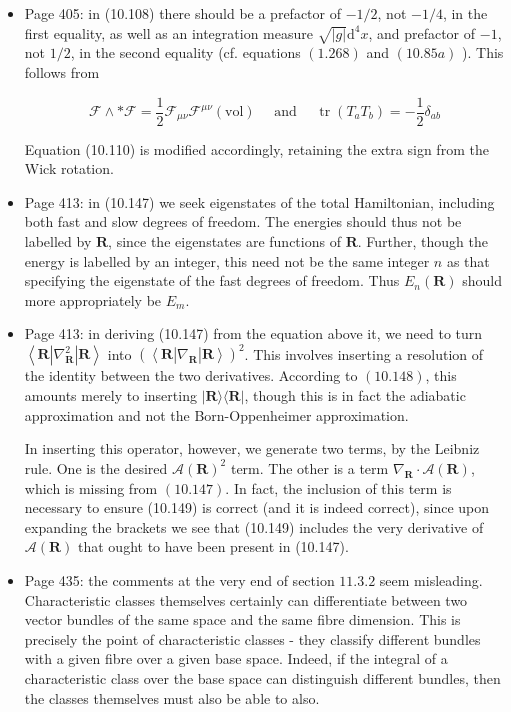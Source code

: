 \documentclass{article}
\begin{document}
\begin{itemize}
\item Page 405: in (10.108) there should be a prefactor of $-1 / 2$, not $-1 / 4$, in the first equality, as well as an integration measure $\sqrt{|g|} \mathrm{d}^{4} x$, and prefactor of $-1$, not $1 / 2$, in the second equality (cf. equations $(1.268)$ and $(10.85 a)$ ). This follows from

$$
\mathcal{F} \wedge * \mathcal{F}=\frac{1}{2} \mathcal{F}_{\mu \nu} \mathcal{F}^{\mu \nu}(\mathrm{vol}) \quad \text { and } \quad \operatorname{tr}\left(T_{a} T_{b}\right)=-\frac{1}{2} \delta_{a b}
$$

Equation (10.110) is modified accordingly, retaining the extra sign from the Wick rotation.

\item Page 413: in (10.147) we seek eigenstates of the total Hamiltonian, including both fast and slow degrees of freedom. The energies should thus not be labelled by $\mathbf{R}$, since the eigenstates are functions of $\mathbf{R}$. Further, though the energy is labelled by an integer, this need not be the same integer $n$ as that specifying the eigenstate of the fast degrees of freedom. Thus $E_{n}(\mathbf{R})$ should more appropriately be $E_{m}$.

\item Page 413: in deriving (10.147) from the equation above it, we need to turn $\left\langle\mathbf{R}\left|\nabla_{\mathbf{R}}^{2}\right| \mathbf{R}\right\rangle$ into $\left(\left\langle\mathbf{R}\left|\nabla_{\mathbf{R}}\right| \mathbf{R}\right\rangle\right)^{2}$. This involves inserting a resolution of the identity between the two derivatives. According to $(10.148)$, this amounts merely to inserting $|\mathbf{R}\rangle\langle\mathbf{R}|$, though this is in fact the adiabatic approximation and not the Born-Oppenheimer approximation.

In inserting this operator, however, we generate two terms, by the Leibniz rule. One is the desired $\mathcal{A}(\mathbf{R})^{2}$ term. The other is a term $\nabla_{\mathbf{R}} \cdot \mathcal{A}(\mathbf{R})$, which is missing from $(10.147)$. In fact, the inclusion of this term is necessary to ensure (10.149) is correct (and it is indeed correct), since upon expanding the brackets we see that (10.149) includes the very derivative of $\mathcal{A}(\mathbf{R})$ that ought to have been present in (10.147).

\item Page 435: the comments at the very end of section $11.3 .2$ seem misleading. Characteristic classes themselves certainly can differentiate between two vector bundles of the same space and the same fibre dimension. This is precisely the point of characteristic classes - they classify different bundles with a given fibre over a given base space. Indeed, if the integral of a characteristic class over the base space can distinguish different bundles, then the classes themselves must also be able to also.


\end{itemize}
\end{document}
